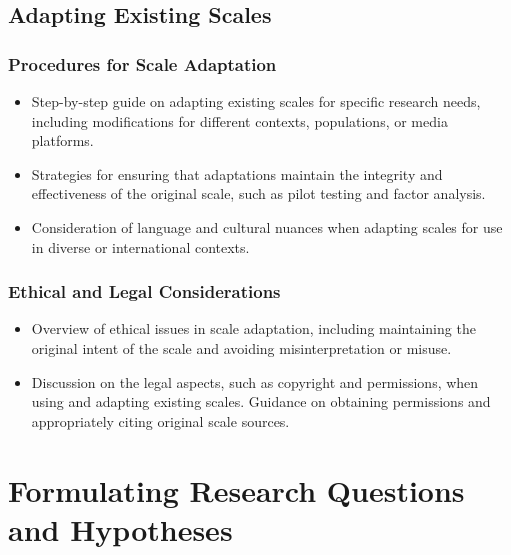 \documentclass[
]{book}
\begin{document}
\hypertarget{adapting-existing-scales}{%
\section*{Adapting Existing Scales}\label{adapting-existing-scales}}

\hypertarget{procedures-for-scale-adaptation}{%
\subsection*{Procedures for Scale Adaptation}\label{procedures-for-scale-adaptation}}

\begin{itemize}
\item
  Step-by-step guide on adapting existing scales for specific research needs, including modifications for different contexts, populations, or media platforms.
\item
  Strategies for ensuring that adaptations maintain the integrity and effectiveness of the original scale, such as pilot testing and factor analysis.
\item
  Consideration of language and cultural nuances when adapting scales for use in diverse or international contexts.
\end{itemize}

\hypertarget{ethical-and-legal-considerations}{%
\subsection*{Ethical and Legal Considerations}\label{ethical-and-legal-considerations}}

\begin{itemize}
\item
  Overview of ethical issues in scale adaptation, including maintaining the original intent of the scale and avoiding misinterpretation or misuse.
\item
  Discussion on the legal aspects, such as copyright and permissions, when using and adapting existing scales. Guidance on obtaining permissions and appropriately citing original scale sources.
\end{itemize}

\hypertarget{formulating-research-questions-and-hypotheses}{%
\chapter*{Formulating Research Questions and Hypotheses}\label{formulating-research-questions-and-hypotheses}}
\end{document}

